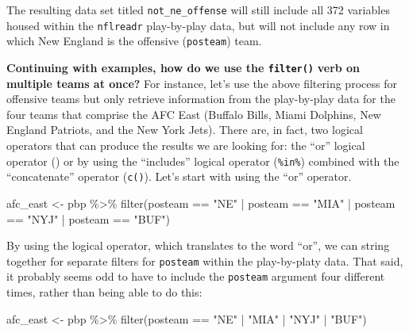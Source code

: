 \documentclass[
  letterpaper,
]{krantz}
\newenvironment{Shaded}{\begin{snugshade}}{\end{snugshade}}
\newcommand{\FunctionTok}[1]{\textcolor[rgb]{0.28,0.35,0.67}{#1}}
\newcommand{\NormalTok}[1]{\textcolor[rgb]{0.00,0.23,0.31}{#1}}
\newcommand{\OtherTok}[1]{\textcolor[rgb]{0.00,0.23,0.31}{#1}}
\newcommand{\SpecialCharTok}[1]{\textcolor[rgb]{0.37,0.37,0.37}{#1}}
\newcommand{\StringTok}[1]{\textcolor[rgb]{0.13,0.47,0.30}{#1}}
\begin{document}
The resulting data set titled \texttt{not\_ne\_offense} will still
include all 372 variables housed within the \texttt{nflreadr}
play-by-play data, but will not include any row in which New England is
the offensive (\texttt{posteam}) team.

\textbf{Continuing with examples, how do we use the \texttt{filter()}}
\textbf{verb on multiple teams at once?} For instance, let's use the
above filtering process for offensive teams but only retrieve
information from the play-by-play data for the four teams that comprise
the AFC East (Buffalo Bills, Miami Dolphins, New England Patriots, and
the New York Jets). There are, in fact, two logical operators that can
produce the results we are looking for: the ``or'' logical operator
(\texttt{\textbar{}}) or by using the ``includes'' logical operator
(\texttt{\%in\%}) combined with the ``concatenate'' operator
(\texttt{c()}). Let's start with using the ``or'' operator.

\begin{Shaded}
\begin{Highlighting}[]
\NormalTok{afc\_east }\OtherTok{\textless{}{-}}\NormalTok{ pbp }\SpecialCharTok{\%\textgreater{}\%}
  \FunctionTok{filter}\NormalTok{(posteam }\SpecialCharTok{==} \StringTok{"NE"} \SpecialCharTok{|}\NormalTok{ posteam }\SpecialCharTok{==} \StringTok{"MIA"}
         \SpecialCharTok{|}\NormalTok{ posteam }\SpecialCharTok{==} \StringTok{"NYJ"} \SpecialCharTok{|}\NormalTok{ posteam }\SpecialCharTok{==} \StringTok{"BUF"}\NormalTok{)}
\end{Highlighting}
\end{Shaded}

By using the \texttt{\textbar{}} logical operator, which translates to
the word ``or'', we can string together for separate filters for
\texttt{posteam} within the play-by-platy data. That said, it probably
seems odd to have to include the \texttt{posteam} argument four
different times, rather than being able to do this:

\begin{Shaded}
\begin{Highlighting}[]
\NormalTok{afc\_east }\OtherTok{\textless{}{-}}\NormalTok{ pbp }\SpecialCharTok{\%\textgreater{}\%}
  \FunctionTok{filter}\NormalTok{(posteam }\SpecialCharTok{==} \StringTok{"NE"} \SpecialCharTok{|} \StringTok{"MIA"} \SpecialCharTok{|} \StringTok{"NYJ"} \SpecialCharTok{|} \StringTok{"BUF"}\NormalTok{)}
\end{Highlighting}
\end{Shaded}
\end{document}

